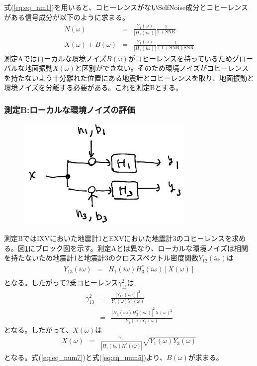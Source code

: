 式(\ref{eq:eq_nm1})を用いると、コヒーレンスがないSelfNoise成分とコヒーレンスがある信号成分が以下のように求まる。
\begin{eqnarray}
  N(\omega) &=& \frac{Y_{1}(\omega)}{\left| H_{1}(i\omega) \right|}\frac{1}{1+\mathrm{SNR}} \label{eq:eq_nm4}\\
  X(\omega) + B(\omega) &=& \frac{Y_{1}(\omega)}{\left| H_{1}(i\omega) \right|}\frac{1}{(1+\mathrm{SNR})\mathrm{SNR}} \label{eq:eq_num5}
\end{eqnarray}
測定Aではローカルな環境ノイズ$B(\omega)$がコヒーレンスを持っているためグローバルな地面振動$X({\omega})$と区別ができない。そのため環境ノイズがコヒーレンスを持たないよう十分離れた位置にある地震計とコヒーレンスを取り、地面振動と環境ノイズを分離する必要がある。これを測定Bとする。


\subsubsection{測定B:ローカルな環境ノイズの評価}
\begin{figure}[H]
  \begin{center}
    \includegraphics[width=8.5cm]{./img_noisemeasurement_testb.png}
  \end{center}
  \caption{
  }\label{img:img_testB}
\end{figure}

測定BではIXVにおいた地震計1とEXVにおいた地震計3のコヒーレンスを求める。図\ref{img:img_testB}にブロック図を示す。測定Aとは異なり、ローカルな環境ノイズは相関を持たないため地震計1と地震計3のクロススペクトル密度関数$Y_{12}(i\omega)$は
\begin{eqnarray}
Y_{13}(i\omega) &=& H_{1}(i\omega)H_{3}^{*}(i\omega)\left[X(\omega) \right] \\ 
\end{eqnarray}
となる。したがって2乗コヒーレンス$\gamma_{13}^{2}$は,
\begin{eqnarray}
  \gamma_{13}^{2} &=& \frac{\left| Y_{13}(i\omega)\right|^{2}}{Y_1(\omega)Y_3({\omega})}\\
  &=& \frac{\left | H_{1}(i\omega)H_{3}^{*}(i\omega)\right|^{2}X(\omega)^{2}}{Y_1(\omega)Y_3({\omega})}\label{eq:eq_num6}
\end{eqnarray}
となる。したがって、$X(\omega)$は
\begin{eqnarray}
  X(\omega) &=& \frac{\gamma_{13}}{\left | H_{1}(i\omega)H_{3}^{*}(i\omega)\right|}
  \sqrt{Y_1(\omega)Y_3({\omega})} \label{eq:eq_num7}
\end{eqnarray}
となる。式(\ref{eq:eq_num7})と式(\ref{eq:eq_num5})より、$B(\omega)$が求まる。


